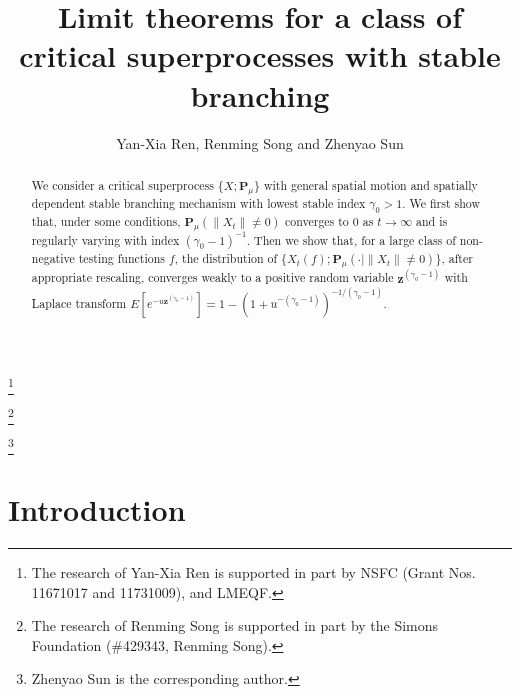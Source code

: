 \documentclass[12pt,a4paper]{amsart}
\theoremstyle{definition}
\numberwithin{equation}{section}
\begin{document}
\title
[Superprocesses with stable branching]
{\large Limit theorems for a class of critical superprocesses with stable branching}
\author[Y.-X. Ren, R. Song and Z. Sun]{Yan-Xia Ren, Renming Song and Zhenyao Sun}
\address
{Yan-Xia Ren\\
	School of Mathematical Sciences\\
	Peking University\\
	Beijing, P. R. China, 100871}
\thanks{The research of Yan-Xia Ren is supported in part by NSFC (Grant Nos. 11671017  and 11731009), and LMEQF.
}
\address
{Renming Song\\
	Dept of Mathematics\\
	University of Illinois at Urbana-Champaign\\
	Urbana, IL, USA, 61801}
\thanks{The research of Renming Song is supported in part by the Simons Foundation (\#429343, Renming Song).}
\address
{Zhenyao Sun\\
School of Mathematics and Statistics\\
Wuhan University\\
Wuhan, Hubei, P. R. China, 430072}
\thanks{Zhenyao Sun is the corresponding author.}
\begin{abstract}
  We consider a critical superprocess $\{X;\mathbf P_\mu\}$ with general spatial motion and spatially dependent stable branching mechanism with lowest stable index $\gamma_0 > 1$. We first show that, under some conditions, $\mathbf P_{\mu}(\|X_t\|\neq 0)$ converges to $0$ as $t\to \infty$ and is regularly varying with index $(\gamma_0-1)^{-1}$. Then we show that, for a large class of non-negative testing functions $f$, the distribution of $\{X_t(f);\mathbf P_\mu(\cdot|\|X_t\|\neq 0)\}$, after appropriate rescaling, converges weakly to a positive random variable $\mathbf z^{(\gamma_0-1)}$ with Laplace transform $E[e^{-u\mathbf z^{(\gamma_0-1)}}]=1-(1+u^{-(\gamma_0-1)})^{-1/(\gamma_0-1)}.$
\end{abstract}
\maketitle
\section{Introduction}
\end{document}
